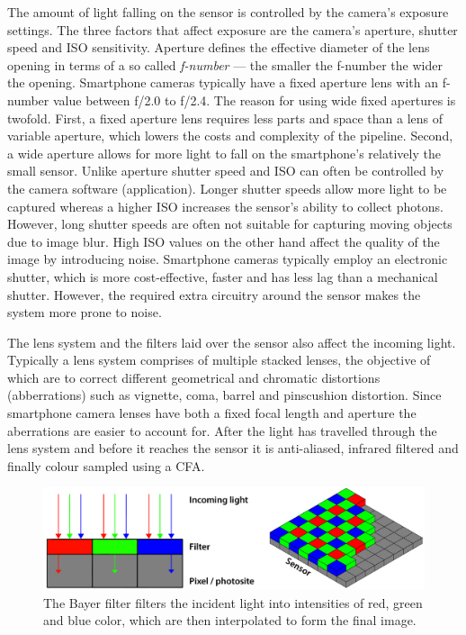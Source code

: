 \documentclass[thesis.tex]{subfiles}
\begin{document}
The amount of light falling on the sensor is controlled by the camera's exposure settings. The three factors that affect exposure are the camera's aperture, shutter speed and ISO sensitivity. Aperture defines the effective diameter of the lens opening in terms of a so called \textit{f-number} --- the smaller the f-number the wider the opening. Smartphone cameras typically have a fixed aperture lens with an f-number value between f/2.0 to f/2.4. The reason for using wide fixed apertures is twofold. First, a fixed aperture lens requires less parts and space than a lens of variable aperture, which lowers the costs and complexity of the pipeline. Second, a wide aperture allows for more light to fall on the smartphone's relatively the small sensor. Unlike aperture shutter speed and ISO can often be controlled by the camera software (application). Longer shutter speeds allow more light to be captured whereas a higher ISO increases the sensor's ability to collect photons. However, long shutter speeds are often not suitable for capturing moving objects due to image blur. High ISO values on the other hand affect the quality of the image by introducing noise. Smartphone cameras typically employ an electronic shutter, which is more cost-effective, faster and has less lag than a mechanical shutter. However, the required extra circuitry around the sensor makes the system more prone to noise.

The lens system and the filters laid over the sensor also affect the incoming light. Typically a lens system comprises of multiple stacked lenses, the objective of which are to correct different geometrical and chromatic distortions (abberrations) such as vignette, coma, barrel and pinscushion distortion. Since smartphone camera lenses have both a fixed focal length and aperture the aberrations are easier to account for. After the light has travelled through the lens system and before it reaches the sensor it is anti-aliased, infrared filtered and finally colour sampled using a CFA. \cite{color_pipeline}

\begin{figure}[ht]
\centering \includegraphics[width=\textwidth]{images/bayer}
\caption{The Bayer filter filters the incident light into intensities of red, green and blue color, which are then interpolated to form the final image. \label{figure:bayer}}
\end{figure}
\end{document}
